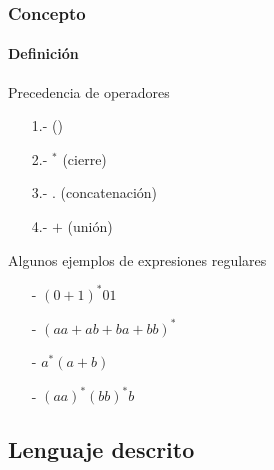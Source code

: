 \documentclass{beamer}
\begin{document}
        \begin{frame}
			\frametitle{Concepto}
			\framesubtitle{Definici\'on}

			\begin{block}{Precedencia de operadores}
			    \begin{itemize}
			        \item[1.-] ()
			        \item[2.-] $^{*}$ (cierre)
			        \item[3.-] . (concatenaci\'on)
			        \item[4.-] $+$ (uni\'on)
			    \end{itemize}
			\end{block}

			\begin{exampleblock}{Algunos ejemplos de expresiones regulares}
			   \begin{itemize}
			       \item[-] $(0+1)^{*}01$
			       \item[-] $(aa+ab+ba+bb)^{*}$
			       \item[-] $a^{*}(a+b)$
			       \item[-] $(aa)^{*}(bb)^{*}b$
			   \end{itemize}
			\end{exampleblock}
		\end{frame}

        \subsection{Lenguaje descrito}
\end{document}

